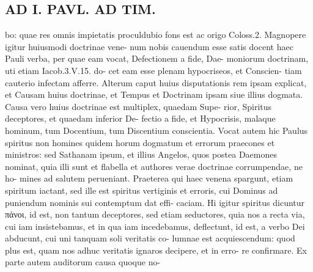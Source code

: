 \documentclass{article}
\begin{document}
\begin{pages}
\section*{AD I. PAVL. AD TIM. }
\marginpar{[ p.1o4 ]}bo: quae res omnis impietatis proculdubio fons est ac origo Coloss.2. Magnopere igitur huiusmodi doctrinae vene- num nobis cauendum esse satis docent haec Pauli verba, per quae eam vocat, Defectionem a fide, Dae- moniorum doctrinam, uti etiam Iacob.3.V.15. do- cet eam esse plenam hypocriseos, et Conscien- tiam cauterio infectam afferre. Alterum caput huius disputationis rem ipsam explicat, et Causam huius doctrinae, et Tempus et Doctrinam ipsam siue illius dogmata. Causa vero huius doctrinae est multiplex, quaedam Supe- rior, Spiritus deceptores, et quaedam inferior De- fectio a fide, et Hypocrisis, malaque hominum, tum Docentium, tum Discentium conscientia. Vocat autem hic Paulus spiritus non homines quidem horum dogmatum et errorum praecones et ministros: sed Sathanam ipsum, et illius Angelos, quos postea Daemones nominat, quia illi sunt et flabella et authores verae doctrinae corrumpendae, ne ho- mines ad salutem perueniant. Praeterea qui haec venena spargunt, etiam spiritum iactant, sed ille est spiritus vertiginis et erroris, cui Dominus ad puniendum nominis sui contemptum dat effi- caciam. Hi igitur spiritus dicuntur πάνοι, id est, non tantum deceptores, sed etiam seductores, quia nos a recta via, cui iam insistebamus, et in qua iam incedebamus, deflectunt, id est, a verbo Dei abducunt, cui uni tanquam soli veritatis co- lumnae est acquiescendum: quod plus est, quam nos adhuc veritatis ignaros decipere, et in erro- re confirmare. Ex parte autem auditorum causa quoque no- 

\end{pages}
\end{document}
